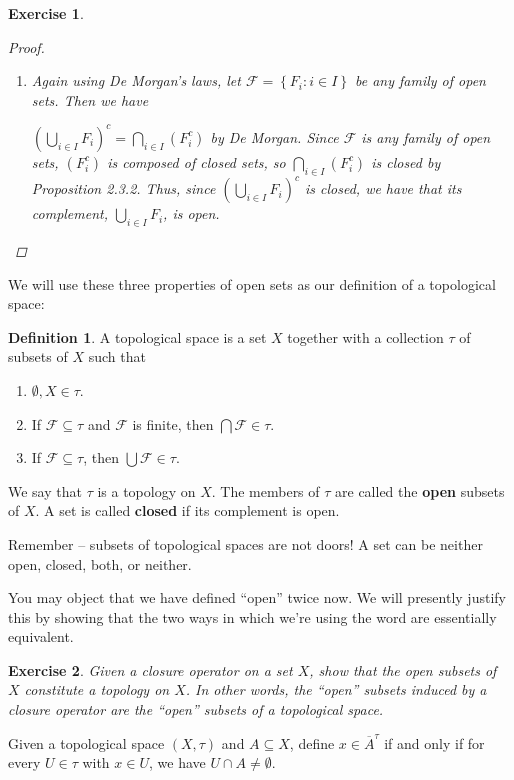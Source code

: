 \documentclass[12pt]{amsart}
\newtheorem{exercise}{Exercise}[section]
\theoremstyle{definition}
\newtheorem{definition}[theorem]{Definition}
\theoremstyle{remark}
\newcommand{\0}{\emptyset}
\newcommand{\closure}[1]{\overline{#1}}
\newcommand{\F}{\mathcal F}
\begin{document}
\begin{exercise}
\begin{proof}
\begin{enumerate}
		 \item Again using De Morgan's laws, let $\F = \left\{ F_i:i \in I \right\}$ be any family of open sets. Then we have
		 
		 $\left( \bigcup_{i \in I}F_i \right)^c = \bigcap_{i \in I}\left(F_i^c\right)$ by De Morgan. Since $\F$ is any family of open sets, $\left( F_i^c \right)$ is composed of closed sets, so $\bigcap_{i \in I}\left(F_i^c\right)$ is closed by Proposition 2.3.2. Thus, since  $\left( \bigcup_{i \in I}F_i \right)^c$ is closed, we have that its complement, $ \bigcup_{i \in I}F_i$, is open.
	\end{enumerate}

\end{proof}
\end{exercise}


We will use these three properties of open sets as our definition of a topological space:

\begin{definition}
A topological space is a set $X$ together with a collection $\tau$ of subsets of $X$ such that
\begin{enumerate}
\item $\0, X \in \tau$.
\item If $\F \subseteq \tau$ and $\F$ is finite, then $\bigcap \F \in \tau$.
\item If $\F \subseteq \tau$, then $\bigcup \F \in \tau$.
\end{enumerate}
We say that $\tau$ is a topology on $X$. The members of $\tau$ are called the \textbf{open} subsets of $X$. A set is called \textbf{closed} if its complement is open.
\end{definition}

Remember -- subsets of topological spaces are not doors! A set can be neither open, closed, both, or neither.

You may object that we have defined ``open'' twice now. We will presently justify this by showing that the two ways in which we're using the word are essentially equivalent.

\begin{exercise}\label{ex:closureoperatortotopology}
Given a closure operator on a set $X$, show that the open subsets of $X$ constitute a topology on $X$. In other words, the ``open'' subsets induced by a closure operator are the ``open'' subsets of a topological space.
\end{exercise}

Given a topological space $(X,\tau)$ and $A \subseteq X$, define $x \in \closure{A}^\tau$ if and only if for every $U \in \tau$ with $x \in U$, we have $U \cap A \neq \0$.
\end{document}
